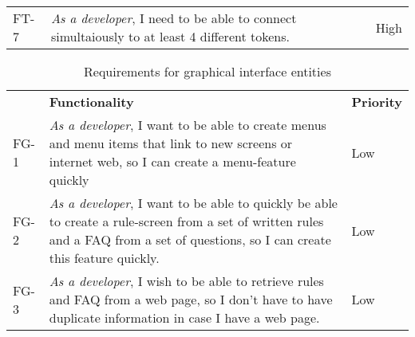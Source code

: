 \begin{table}
\begin{tabular}{ | m{1cm} | m{9cm}| m{1.5cm} | }
FT-7 & \emph{As a developer}, I need to be able to connect simultaiously to at least 4 different tokens. & High 
\end{tabular}
\end{table}

\begin{table}
\centering
\caption{Requirements for graphical interface entities}
\label{freq:graphic}
\begin{tabular}{ | m{1cm} | m{9cm}| m{1.5cm} | }
     & {\bf Functionality}                                                                                                                                                                                                          & {\bf Priority} \\
FG-1 & \emph{As a developer}, I want to be able to create menus and menu items that link to new screens or internet web, so I can create a menu-feature quickly                                                                            & Low            \\
FG-2 & \emph{As a developer}, I want to be able to quickly be able to create a rule-screen from a set of written rules and a FAQ from a set of questions, so I can create this feature quickly. & Low            \\
FG-3 & \emph{As a developer}, I wish to be able to retrieve rules and FAQ from a web page, so I don't have to have duplicate information in case I have a web page.                       & Low           
\end{tabular}
\end{table}

